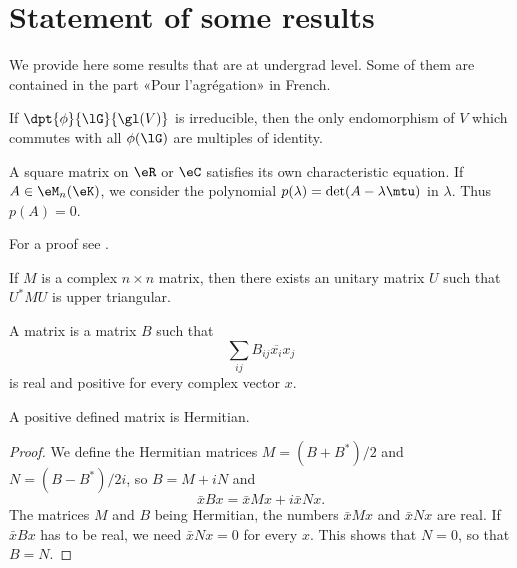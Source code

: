 
\section{Statement of some results}

We provide here some results that are at undergrad level. Some of them are contained in the part «Pour l'agrégation» in French.

\begin{lemma} \label{lem:Schur}
If $\dpt{\phi}{\lG}{\gl(V)}$ is irreducible, then the only endomorphism of $V$ which commutes with all $\phi(\lG)$ are multiples of identity.
\end{lemma}

\begin{theorem} \label{ThoCayleyHamilton}
    A square matrix on \( \eR\) or \( \eC\) satisfies its own characteristic equation. If \( A\in\eM_n(\eK)\), we consider the polynomial \( p(\lambda)=\det(A-\lambda\mtu)\) in \( \lambda\). Thus \( p(A)=0\).
\end{theorem}
For a proof see .

\begin{proposition}     \label{PropMtrDiagablaUnit}
    If \( M\) is a complex \( n\times n\) matrix, then there exists an unitary matrix \( U\) such that \( U^*MU\) is upper triangular.
\end{proposition}

\begin{definition}
    A  matrix is a matrix $B$ such that
    \begin{equation}
        \sum_{ij}B_{ij}\overline{ x_i }x_j
    \end{equation}
    is real and positive for every complex vector $x$.
\end{definition}

\begin{proposition}
    A positive defined matrix is Hermitian.
\end{proposition}

\begin{proof}
    We define the Hermitian matrices $M=(B+B^*)/2$ and $N=(B-B^*)/2i$, so $B=M+iN$ and
    \begin{equation}
        \bar x Bx=\bar x M x+i\bar x Nx.
    \end{equation}
    The matrices $M$ and $B$ being Hermitian, the numbers $\bar xMx$ and $\bar xNx$ are real. If $\bar xBx$ has to be real, we need $\bar xNx=0$ for every $x$. This shows that $N=0$, so that $B=N$.
\end{proof}


